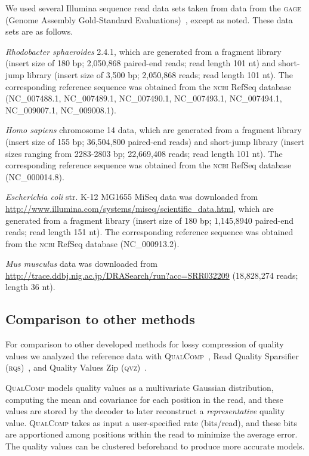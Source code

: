 \documentclass{bmcart}
\begin{document}
We used several Illumina sequence read data sets taken from data from
the \textsc{gage} (Genome Assembly Gold-Standard
Evaluations)~\cite{Salzberg:2012rc}, except as noted. These data sets
are as follows.

\textit{Rhodobacter sphaeroides} 2.4.1, which are generated from a
fragment library (insert size of 180 bp; 2,050,868 paired-end reads;
read length 101 nt) and short-jump library (insert size of 3,500 bp;
2,050,868 reads; read length 101 nt). The corresponding reference
sequence was obtained from the \textsc{ncbi} RefSeq database
(NC\_007488.1, NC\_007489.1, NC\_007490.1, NC\_007493.1, NC\_007494.1,
NC\_009007.1, NC\_009008.1).

\textit{Homo sapiens} chromosome 14 data, which are generated from a
fragment library (insert size of 155 bp; 36,504,800 paired-end reads)
and short-jump library (insert sizes ranging from 2283-2803 bp;
22,669,408 reads; read length 101 nt). The corresponding reference
sequence was obtained from the \textsc{ncbi} RefSeq database
(NC\_000014.8).

\textit{Escherichia coli} str. K-12 MG1655 MiSeq data was downloaded
from \url{http://www.illumina.com/systems/miseq/scientific_data.html},
which are generated from a fragment library (insert size of 180 bp;
1,145,8940 paired-end reads; read length 151 nt). The corresponding
reference sequence was obtained from the \textsc{ncbi} RefSeq database
(NC\_000913.2).

\textit{Mus musculus} data was downloaded from
\url{http://trace.ddbj.nig.ac.jp/DRASearch/run?acc=SRR032209}
(18,828,274 reads; length 36 nt).

\subsection*{Comparison to other methods}

For comparison to other developed methods for lossy compression of
quality values we analyzed the reference data with
\textsc{QualComp}~\cite{Ochoa:2013rt}, Read Quality Sparsifier
(\textsc{rqs})~\cite{DBLP:conf/recomb/YuYB14}, and Quality Values Zip
(\textsc{qvz)}~\cite{Malysa01102015}.

\textsc{QualComp} models quality values as a multivariate Gaussian
distribution, computing the mean and covariance for each position in
the read, and these values are stored by the decoder to later
reconstruct a \emph{representative} quality value. \textsc{QualComp}
takes as input a user-specified rate (bits/read), and these bits are
apportioned among positions within the read to minimize the average
error. The quality values can be clustered beforehand to produce more
accurate models.
\end{document}
